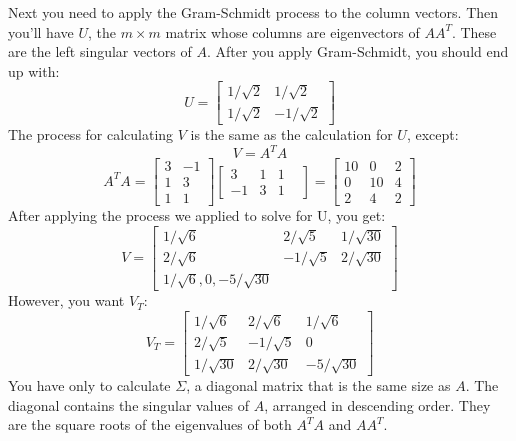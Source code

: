 Next you need to apply the Gram-Schmidt process to the column vectors. Then you'll have $U$, the $m \times m$ matrix whose columns are eigenvectors of $AA^T$. These are the left singular vectors of $A$. After you apply Gram-Schmidt, you should end up with:
$$
U = \begin{bmatrix}
1/\sqrt{2} & 1/\sqrt{2} \\
1/\sqrt{2} & -1/\sqrt{2} 
\end{bmatrix}
$$
The process for calculating $V$ is the same as the calculation for $U$, except:
$$V = A^TA$$ 
$$A^TA = 
\begin{bmatrix}
3 & -1\\
1 & 3\\
1 & 1
\end{bmatrix}
\begin{bmatrix}
3 & 1 & 1\\
-1 & 3 & 1&
\end{bmatrix}
=
\begin{bmatrix}
10 & 0 & 2 \\
0 & 10 & 4 \\
2 & 4 & 2
\end{bmatrix}
$$
After applying the process we applied to solve for U, you get:
$$
V = \begin{bmatrix}
1/\sqrt{6} & 2/\sqrt{5} & 1/\sqrt{30} \\
2/\sqrt{6} & -1/\sqrt{5} & 2/\sqrt{30}\\
1/\sqrt{6},0,-5/\sqrt{30}
\end{bmatrix}
$$
However, you want $V_T$:
$$
V_T =
\begin{bmatrix}
1/\sqrt{6} & 2/\sqrt{6} & 1/\sqrt{6} \\
2/\sqrt{5} & -1/\sqrt{5} & 0\\
1/\sqrt{30} & 2/\sqrt{30} & -5/\sqrt{30}
\end{bmatrix}
$$
You have only to calculate $\Sigma$, a diagonal matrix that is the same size as $A$. The diagonal contains the singular values of $A$, arranged in descending order. They are the square roots of the eigenvalues of both $A^TA$ and  $AA^T$.

